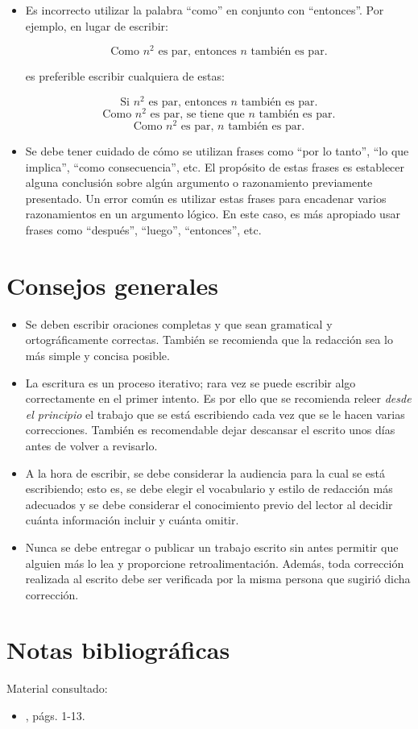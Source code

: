 \begin{itemize}
    \item Es incorrecto utilizar la palabra ``como'' en conjunto con ``entonces''.
    Por ejemplo, en lugar de escribir:
    
    \[
        \text{Como }n^{2}\text{ es par, entonces }n\text{ también es par.}
    \]
    
    es preferible escribir cualquiera de estas:

    \[
        \text{Si }n^{2}\text{ es par, entonces }n\text{ también es par.}
    \]
    \[
        \text{Como }n^{2}\text{ es par, se tiene que }n\text{ también es par.}
    \]
    \[
        \text{Como }n^{2}\text{ es par, }n\text{ también es par.}
    \]
    
    \item Se debe tener cuidado de cómo se utilizan frases como ``por lo tanto'',
    ``lo que implica'', ``como consecuencia'', etc. El propósito de estas frases
    es establecer alguna conclusión sobre algún argumento o razonamiento previamente
    presentado. Un error común es utilizar estas frases para encadenar varios
    razonamientos en un argumento lógico. En este caso, es más apropiado
    usar frases como ``después'', ``luego'', ``entonces'', etc.

\end{itemize}

\section{Consejos generales}

\begin{itemize}
    \item Se deben escribir oraciones completas y que sean gramatical y ortográficamente
    correctas. También se recomienda que la redacción sea lo más simple y concisa posible.
    \item La escritura es un proceso iterativo; rara vez se puede escribir algo
    correctamente en el primer intento. Es por ello que se recomienda
    releer \emph{desde el principio} el trabajo que se está escribiendo
    cada vez que se le hacen varias correcciones. También es recomendable
    dejar descansar el escrito unos días antes de volver a revisarlo. 
    \item A la hora de escribir, se debe considerar la audiencia para la cual
    se está escribiendo; esto es, se debe elegir el vocabulario y estilo
    de redacción más adecuados y se debe considerar el conocimiento
    previo del lector al decidir cuánta información incluir y cuánta omitir. 
    \item Nunca se debe entregar o publicar un trabajo escrito sin antes permitir
    que alguien más lo lea y proporcione retroalimentación. Además, toda
    corrección realizada al escrito debe ser verificada por la misma persona
    que sugirió dicha corrección.
\end{itemize}

\section*{Notas bibliográficas}

Material consultado:
\begin{itemize}
    \item \textcite{chartrand_mathematical_2012}, págs. 1-13.
\end{itemize}

